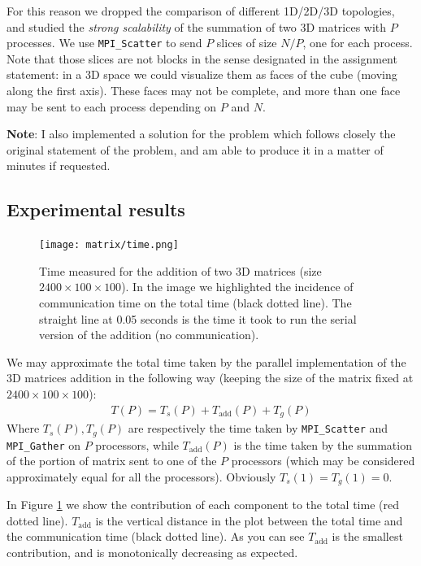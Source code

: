 \documentclass{article}
\begin{document}
For this reason we dropped the comparison of different 1D/2D/3D topologies, and studied the \emph{strong scalability} of the summation of two 3D matrices with $P$ processes. We use \texttt{MPI\_Scatter} to send $P$ slices of size $N/P$, one for each process. Note that those slices are not blocks in the sense designated in the assignment statement: in a 3D space we could visualize them as faces of the cube (moving along the first axis). These faces may not be complete, and more than one face may be sent to each process depending on $P$ and $N$.

\textbf{Note}: I also implemented a solution for the problem which follows closely the original statement of the problem, and am able to produce it in a matter of minutes if requested.

\subsection{Experimental results}
\begin{figure}[b!]
    \centering
    \texttt{[image: matrix/time.png]}
    \caption{Time measured for the addition of two 3D matrices (size $2400\times 100\times 100$). In the image we highlighted the incidence of communication time on the total time (black dotted line). The straight line at 0.05 seconds is the time it took to run the serial version of the addition (no communication).}
    \label{fig:matrix_performance}
\end{figure}

We may approximate the total time taken by the parallel implementation of the 3D matrices addition in the following way (keeping the size of the matrix fixed at $2400\times 100\times 100$):
\begin{gather}\label{eq:matrix_time_equation}
    T(P) = T_s(P) + T_\text{add}(P) + T_g(P)
\end{gather}
Where $T_s(P), T_g(P)$ are respectively the time taken by \texttt{MPI\_Scatter} and \texttt{MPI\_Gather} on $P$ processors, while $T_\text{add}(P)$ is the time taken by the summation of the portion of matrix sent to one of the $P$ processors (which may be considered approximately equal for all the processors). Obviously $T_s(1) = T_g(1) = 0$.

In Figure \ref{fig:matrix_performance} we show the contribution of each component to the total time (red dotted line). $T_\text{add}$ is the vertical distance in the plot between the total time and the communication time (black dotted line). As you can see $T_\text{add}$ is the smallest contribution, and is monotonically decreasing as expected.
\end{document}
